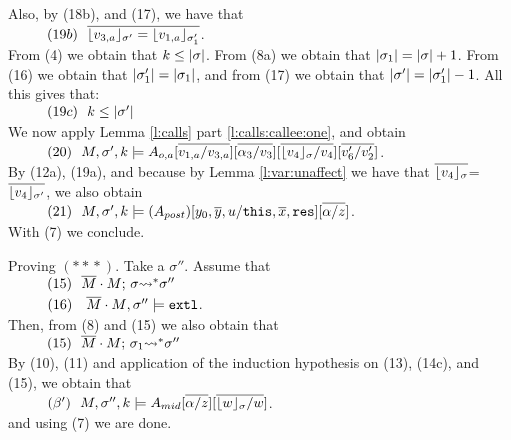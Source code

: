 \begin{description}
Also, by (18b), and (17), we have that   
\\
$\SPS (19b) \ \ \overline {\interpret {\sigma'} {v_{3,a}}  =  \interpret {\sigma_1'} {v_{1,a}} }$.
\\
From (4) we obtain that  $ k \leq \DepthSt {\sigma}$. From  (8a) we obtain that $ \DepthSt {\sigma_1} = \DepthSt {\sigma} +1$. From (16) we obtain that  $ \DepthSt {\sigma_1'} = \DepthSt {\sigma_1}$, and from (17) we obtain that $ \DepthSt {\sigma'} = \DepthSt {\sigma_1'} -1$. All this gives that:\\
$\SPS (19c) \ \ k \leq \DepthSt {\sigma'}$
\\
We now apply Lemma \ref{l:calls} part \ref{l:calls:callee:one}, and obtain  
\\
$\SPS (20) \ \  \satDAssertFrom M  {\sigma'} {k}   {\Aoa[\overline{v_{1,a}/v_{3,a}}][\overline{\alpha_3/v_3}][\overline{\interpret {\sigma} {v_4} /v_4}][\overline {v_6'/ v_2'}]}$.
\\
By  (12a), (19a),  and because  by Lemma \ref{l:var:unaffect} we have that $\overline{\interpret {\sigma} {v_4}}$=$\overline{\interpret {\sigma'} {v_4}}$, we also obtain
\\
$\SPS (21) \ \ \satDAssertFrom M  {\sigma'} {k}   {(A_{post})[y_0,\overline y, u/\prg{this},\overline x, \prg{res}][\overline{\alpha/z}]}$.
\\
With (7) we conclude.




 \vspace{.3cm}
Proving $(*\!*\!*)$. Take a $\sigma''$. Assume that\\
$\SPS (15) \ \ \leadstoBoundedStar   {\Mtwo\cdot M}  {\sigma}  {\sigma''}$\\
$\SPS (16) \ \ \ {\Mtwo\cdot M}, \sigma'' \models \extThis$.\\
Then, from (8) and (15) we also obtain that\\
$\SPS (15) \ \ \leadstoBoundedStar   {\Mtwo\cdot M}  {\sigma_1}  {\sigma''}$\\
By (10), (11) and application of the induction hypothesis on (13),  (14c), and (15), we obtain that\\

$\SPS (\beta') \ \  \satDAssertFrom M  {\sigma''} {k}   {A_{mid}[\overline{\alpha/z}][\overline{\interpret \sigma {w}/w}]}$.\\
and using (7) we are done.




\end{description}
